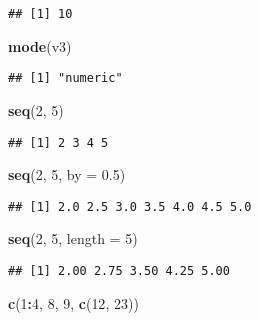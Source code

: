 \documentclass[
]{article}
\newenvironment{Shaded}{\begin{snugshade}}{\end{snugshade}}
\newcommand{\DataTypeTok}[1]{\textcolor[rgb]{0.13,0.29,0.53}{#1}}
\newcommand{\DecValTok}[1]{\textcolor[rgb]{0.00,0.00,0.81}{#1}}
\newcommand{\FloatTok}[1]{\textcolor[rgb]{0.00,0.00,0.81}{#1}}
\newcommand{\KeywordTok}[1]{\textcolor[rgb]{0.13,0.29,0.53}{\textbf{#1}}}
\newcommand{\NormalTok}[1]{#1}
\newcommand{\OperatorTok}[1]{\textcolor[rgb]{0.81,0.36,0.00}{\textbf{#1}}}
\begin{document}
\begin{verbatim}
## [1] 10
\end{verbatim}

\begin{Shaded}
\begin{Highlighting}[]
\KeywordTok{mode}\NormalTok{(v3)}
\end{Highlighting}
\end{Shaded}

\begin{verbatim}
## [1] "numeric"
\end{verbatim}

\begin{Shaded}
\begin{Highlighting}[]
\KeywordTok{seq}\NormalTok{(}\DecValTok{2}\NormalTok{, }\DecValTok{5}\NormalTok{)  }
\end{Highlighting}
\end{Shaded}

\begin{verbatim}
## [1] 2 3 4 5
\end{verbatim}

\begin{Shaded}
\begin{Highlighting}[]
\KeywordTok{seq}\NormalTok{(}\DecValTok{2}\NormalTok{, }\DecValTok{5}\NormalTok{, }\DataTypeTok{by =} \FloatTok{0.5}\NormalTok{)}
\end{Highlighting}
\end{Shaded}

\begin{verbatim}
## [1] 2.0 2.5 3.0 3.5 4.0 4.5 5.0
\end{verbatim}

\begin{Shaded}
\begin{Highlighting}[]
\KeywordTok{seq}\NormalTok{(}\DecValTok{2}\NormalTok{, }\DecValTok{5}\NormalTok{, }\DataTypeTok{length =} \DecValTok{5}\NormalTok{)}
\end{Highlighting}
\end{Shaded}

\begin{verbatim}
## [1] 2.00 2.75 3.50 4.25 5.00
\end{verbatim}

\begin{Shaded}
\begin{Highlighting}[]
\KeywordTok{c}\NormalTok{(}\DecValTok{1}\OperatorTok{:}\DecValTok{4}\NormalTok{, }\DecValTok{8}\NormalTok{, }\DecValTok{9}\NormalTok{, }\KeywordTok{c}\NormalTok{(}\DecValTok{12}\NormalTok{, }\DecValTok{23}\NormalTok{))}
\end{Highlighting}
\end{Shaded}
\end{document}
